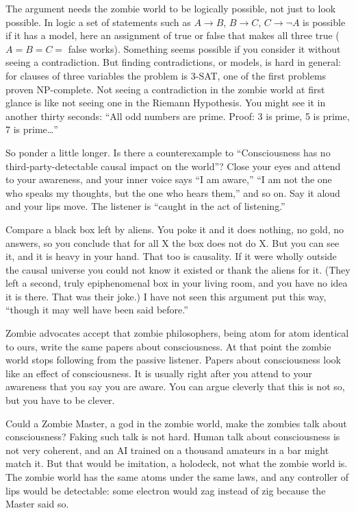 The argument needs the zombie world to be logically possible, not just to look possible. In logic a set of statements such as $A \to B$, $B \to C$, $C \to \neg A$ is possible if it has a model, here an assignment of true or false that makes all three true ($A=B=C=$ false works). Something seems possible if you consider it without seeing a contradiction. But finding contradictions, or models, is hard in general: for clauses of three variables the problem is 3-SAT, one of the first problems proven NP-complete. Not seeing a contradiction in the zombie world at first glance is like not seeing one in the Riemann Hypothesis. You might see it in another thirty seconds: ``All odd numbers are prime. Proof: 3 is prime, 5 is prime, 7 is prime\ldots'' 

So ponder a little longer. Is there a counterexample to ``Consciousness has no third-party-detectable causal impact on the world''? Close your eyes and attend to your awareness, and your inner voice says ``I am aware,'' ``I am not the one who speaks my thoughts, but the one who hears them,'' and so on. Say it aloud and your lips move. The listener is ``caught in the act of listening.''

Compare a black box left by aliens. You poke it and it does nothing, no gold, no answers, so you conclude that for all X the box does not do X. But you can see it, and it is heavy in your hand. That too is causality. If it were wholly outside the causal universe you could not know it existed or thank the aliens for it. (They left a second, truly epiphenomenal box in your living room, and you have no idea it is there. That was their joke.) I have not seen this argument put this way, ``though it may well have been said before.'' 

Zombie advocates accept that zombie philosophers, being atom for atom identical to ours, write the same papers about consciousness. At that point the zombie world stops following from the passive listener. Papers about consciousness look like an effect of consciousness. It is usually right after you attend to your awareness that you say you are aware. You can argue cleverly that this is not so, but you have to be clever.

Could a Zombie Master, a god in the zombie world, make the zombies talk about consciousness? Faking such talk is not hard. Human talk about consciousness is not very coherent, and an AI trained on a thousand amateurs in a bar might match it. But that would be imitation, a holodeck, not what the zombie world is. The zombie world has the same atoms under the same laws, and any controller of lips would be detectable: some electron would zag instead of zig because the Master said so.

